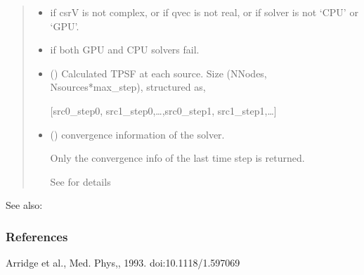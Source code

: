 \documentclass[letterpaper,10pt,english]{sphinxmanual}
\begin{document}
\begin{fulllineitems}
\begin{quote}
\begin{description}
\begin{itemize}
\end{itemize}

\begin{itemize}
\item {} 
\sphinxAtStartPar
{} \textendash{} if csrV is not complex, or if qvec is not real, or if solver is not ‘CPU’ or ‘GPU’.

\item {} 
\sphinxAtStartPar
{} \textendash{} if both GPU and CPU solvers fail.

\end{itemize}

\sphinxAtStartPar
\begin{itemize}
\item {} 
\sphinxAtStartPar
{} () \textendash{} Calculated TPSF at each source. Size (NNodes, Nsources*max\_step), structured as,

\sphinxAtStartPar
{[}src0\_step0, src1\_step0,…,src0\_step1, src1\_step1,…{]}

\item {} 
\sphinxAtStartPar
{} () \textendash{} convergence information of the solver.

\sphinxAtStartPar
Only the convergence info of the last time step is returned.

\sphinxAtStartPar
See {\hyperref[\detokenize{_autosummary/nirfasterff.utils.ConvergenceInfo:nirfasterff.utils.ConvergenceInfo}]{}} for details

\end{itemize}


\end{description}\end{quote}


\begin{sphinxseealso}{See also:}

\sphinxAtStartPar
{\hyperref[\detokenize{_autosummary/nirfasterff.math.gen_mass_matrix:nirfasterff.math.gen_mass_matrix}]{}}


\end{sphinxseealso}

\subsubsection*{References}

\sphinxAtStartPar
Arridge et al., Med. Phys,, 1993. doi:10.1118/1.597069

\end{fulllineitems}
\end{document}
